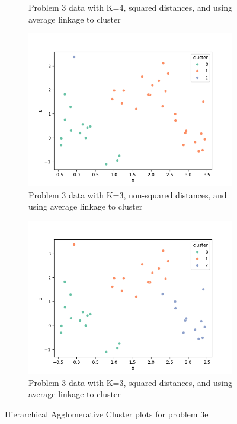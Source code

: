 \documentclass[12pt]{article}
\begin{document}
\begin{figure}[ht!]
\begin{subfigure}{0.5\textwidth}
        \caption{Problem 3 data with K=4, squared distances, and using average linkage to cluster}
        \label{fig:average_squared_4}
    \end{subfigure}
    \begin{subfigure}{0.5\textwidth}
        \centering
        \includegraphics[width=\linewidth]{../plots/average_linkage_3.png}
        \caption{Problem 3 data with K=3, non-squared distances, and using average linkage to cluster}
        \label{fig:average_3}
    \end{subfigure}
    \begin{subfigure}{0.5\textwidth}
        \centering
        \includegraphics[width=\linewidth]{../plots/average_squared_3.png}
        \caption{Problem 3 data with K=3, squared distances, and using average linkage to cluster}
        \label{fig:average_squared_3}
    \end{subfigure}
    \caption{Hierarchical Agglomerative Cluster plots for problem 3e}
\end{figure}
\end{document}
